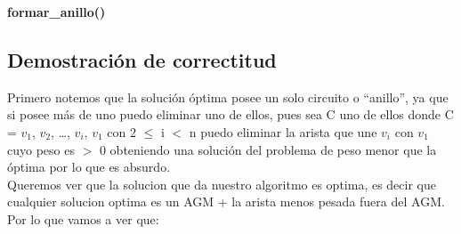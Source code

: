\LinesNumbered
\begin{algorithm}[H]
\DontPrintSemicolon
{}
\caption{\textbf{formar\_anillo()} \label{formar\_anillo }}
\end{algorithm}







\subsection{Demostraci\'on de correctitud} 


Primero notemos que la solución óptima posee un solo circuito o “anillo”, ya que si posee más de uno puedo eliminar uno de ellos, pues sea C uno de ellos donde C = $v_1$, $v_2$, …, $v_i$, $v_1$ con 2 $\leq$ i $<$ n puedo eliminar la arista que une $v_i$ con $v_1$ cuyo peso es $>$ 0 obteniendo una solución del problema de peso menor que la óptima por lo que es absurdo. \\




Queremos ver que la solucion que da nuestro algoritmo es optima, es decir que cualquier solucion optima es un AGM + la arista menos pesada fuera del AGM. Por lo que vamos a ver que: \\


